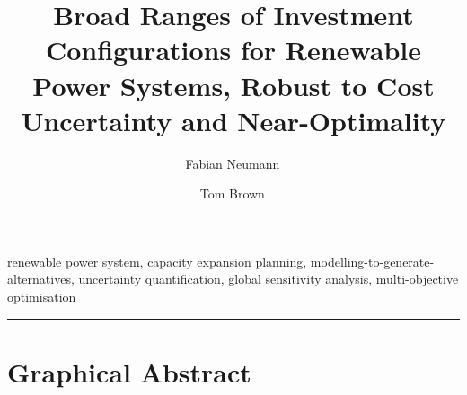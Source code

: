 \documentclass[1p,11pt]{elsarticle}
\begin{document}
\begin{frontmatter}

	\title{Broad Ranges of Investment Configurations for Renewable Power
	Systems, Robust to Cost Uncertainty and Near-Optimality}

	\author[tubaddress,kitaddress]{Fabian
	Neumann\,}
	\author[tubaddress,kitaddress]{Tom Brown\,}
	\address[tubaddress]{Department of Digital Transformation in Energy Systems, Institute of Energy Technology, Technische Universität Berlin (TUB), Einsteinufer 25 (TA 8), 10587, Berlin, Germany}
	\address[kitaddress]{Institute for Automation and Applied Informatics (IAI), Karlsruhe Institute of Technology (KIT), Hermann-von-Helmholtz-Platz 1, 76344, Eggenstein-Leopoldshafen, Germany}

	\begin{abstract}
		
	\end{abstract}

	\begin{keyword}
		renewable power system, capacity expansion planning,
		modelling-to-generate-alternatives, uncertainty quantification, global
		sensitivity analysis, multi-objective optimisation
	\end{keyword}

\end{frontmatter}




\newpage


\par\noindent\rule{\textwidth}{0.4pt}

\section*{Graphical Abstract}
\end{document}
